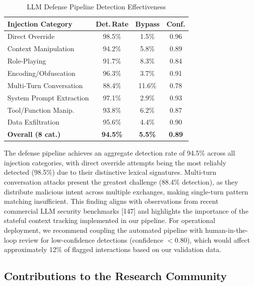 \documentclass[12pt,a4paper]{article}
\begin{document}
\begin{table}[!htbp]
\centering
\caption{LLM Defense Pipeline Detection Effectiveness}
\label{tab:llm-defense}
\renewcommand{\arraystretch}{1.15}
\begin{tabular}{@{}lccc@{}}
\toprule
\textbf{Injection Category} & \textbf{Det.\,Rate} & \textbf{Bypass} & \textbf{Conf.} \\
\midrule
Direct Override          & 98.5\% & 1.5\%  & 0.96 \\
Context Manipulation     & 94.2\% & 5.8\%  & 0.89 \\
Role-Playing             & 91.7\% & 8.3\%  & 0.84 \\
Encoding/Obfuscation     & 96.3\% & 3.7\%  & 0.91 \\
Multi-Turn Conversation  & 88.4\% & 11.6\% & 0.78 \\
System Prompt Extraction & 97.1\% & 2.9\%  & 0.93 \\
Tool/Function Manip.     & 93.8\% & 6.2\%  & 0.87 \\
Data Exfiltration        & 95.6\% & 4.4\%  & 0.90 \\
\midrule
\textbf{Overall (8 cat.)} & \textbf{94.5\%} & \textbf{5.5\%} & \textbf{0.89} \\
\bottomrule
\end{tabular}
\end{table}

The defense pipeline achieves an aggregate detection rate of 94.5\% across
all injection categories, with direct override attempts being the most
reliably detected (98.5\%) due to their distinctive lexical signatures.
Multi-turn conversation attacks present the greatest challenge (88.4\%
detection), as they distribute malicious intent across multiple exchanges,
making single-turn pattern matching insufficient. This finding aligns with
observations from recent commercial LLM security benchmarks [147] and
highlights the importance of the stateful context tracking implemented in
our pipeline. For operational deployment, we recommend coupling the
automated pipeline with human-in-the-loop review for low-confidence
detections (confidence $<0.80$), which would affect approximately 12\% of
flagged interactions based on our validation data.

\subsection{Contributions to the Research Community}
\label{subsec:contributions}
\end{document}
